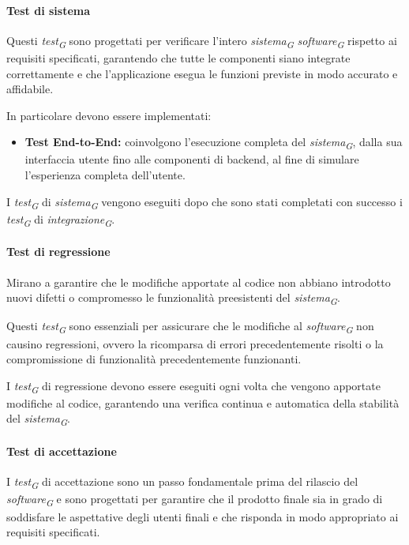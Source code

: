 \paragraph{Test di sistema}
Questi \textit{test}\textsubscript{\textit{G}} sono progettati per verificare l'intero \textit{sistema}\textsubscript{\textit{G}} \textit{software}\textsubscript{\textit{G}} rispetto ai requisiti specificati, garantendo che tutte le componenti siano integrate correttamente e che l'applicazione esegua le funzioni previste in modo accurato e affidabile. 

In particolare devono essere implementati: 
\begin{itemize}
    \item  \textbf{Test End-to-End:} 
        coinvolgono l'esecuzione completa del \textit{sistema}\textsubscript{\textit{G}}, dalla sua interfaccia utente fino alle componenti di backend, al fine di simulare l'esperienza completa dell'utente.
\end{itemize} 

I \textit{test}\textsubscript{\textit{G}} di \textit{sistema}\textsubscript{\textit{G}} vengono eseguiti dopo che sono stati completati con successo i \textit{test}\textsubscript{\textit{G}} di \textit{integrazione}\textsubscript{\textit{G}}. 

\paragraph{Test di regressione}
Mirano a garantire che le modifiche apportate al codice non abbiano introdotto nuovi difetti o compromesso le funzionalità preesistenti del \textit{sistema}\textsubscript{\textit{G}}. 

Questi \textit{test}\textsubscript{\textit{G}} sono essenziali per assicurare che le modifiche al \textit{software}\textsubscript{\textit{G}} non causino regressioni, ovvero la ricomparsa di errori precedentemente risolti o la compromissione di funzionalità precedentemente funzionanti. 

I \textit{test}\textsubscript{\textit{G}} di regressione devono essere eseguiti ogni volta che vengono apportate modifiche al codice, garantendo una verifica continua e automatica della stabilità del \textit{sistema}\textsubscript{\textit{G}}. 

\paragraph{Test di accettazione}
I \textit{test}\textsubscript{\textit{G}} di accettazione sono un passo fondamentale prima del rilascio del \textit{software}\textsubscript{\textit{G}} e sono progettati per garantire che il prodotto finale sia in grado di soddisfare le aspettative degli utenti finali e che risponda in modo appropriato ai requisiti specificati. 

